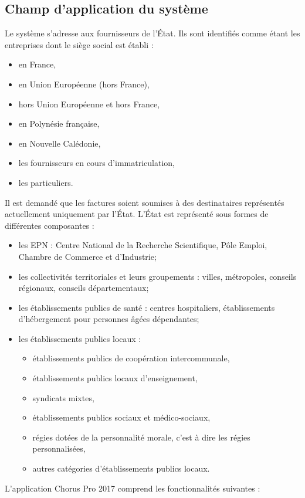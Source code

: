 \documentclass[12pt,a4paper]{article}
\begin{document}
\subsection{Champ d'application du système}
Le système s'adresse aux fournisseurs de l'État. Ils sont identifiés comme étant les entreprises dont le siège social est établi :
\smallbreak
\begin{itemize}
\item en France,
\item en Union Européenne (hors France),
\item hors Union Européenne et hors France,
\item en Polynésie française,
\item en Nouvelle Calédonie,
\item les fournisseurs en cours d’immatriculation,
\item les particuliers.
\end{itemize}
\medbreak
Il est demandé que les factures soient soumises à des destinataires représentés actuellement uniquement par l'État. L'État est représenté sous formes de différentes composantes :
\smallbreak
\begin{itemize}
\item les \gls{EPN} : Centre National de la Recherche Scientifique, Pôle Emploi, Chambre de Commerce et d'Industrie;
\item les collectivités territoriales et leurs groupements : villes, métropoles, conseils
régionaux, conseils départementaux;
\item les établissements publics de santé : centres hospitaliers, établissements d'hébergement pour personnes âgées dépendantes;
\item les établissements publics locaux :
\medbreak
\begin{itemize}
\item établissements publics de coopération intercommunale,
\item établissements publics locaux d’enseignement,
\item syndicats mixtes,
\item établissements publics sociaux et médico-sociaux,
\item régies dotées de la personnalité morale, c’est à dire les régies personnalisées,
\item autres catégories d’établissements publics locaux.
\end{itemize}
\end{itemize}
\newpage
L'application Chorus Pro 2017 comprend les fonctionnalités suivantes :
\end{document}
